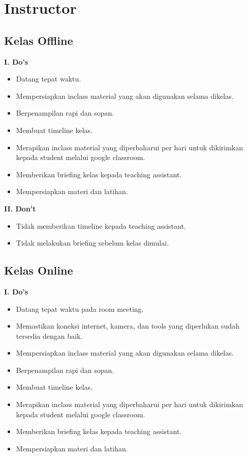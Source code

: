 \documentclass[
]{book}
\providecommand{\tightlist}{%
  \setlength{\itemsep}{0pt}\setlength{\parskip}{0pt}}
\begin{document}
\hypertarget{instructor}{%
\section{Instructor}\label{instructor}}

\hypertarget{kelas-offline-3}{%
\subsection{Kelas Offline}\label{kelas-offline-3}}

\textbf{I. Do's}

\begin{itemize}
\tightlist
\item
  Datang tepat waktu.
\item
  Mempersiapkan inclass material yang akan digunakan selama dikelas.
\item
  Berpenampilan rapi dan sopan.
\item
  Membuat timeline kelas.
\item
  Merapikan inclass material yang diperbaharui per hari untuk dikirimkan kepada student melalui google classroom.
\item
  Memberikan briefing kelas kepada teaching assistant.
\item
  Mempersiapkan materi dan latihan.
\end{itemize}

\textbf{II. Don't}

\begin{itemize}
\tightlist
\item
  Tidak memberikan timeline kepada teaching assistant.
\item
  Tidak melakukan briefing sebelum kelas dimulai.
\end{itemize}

\hypertarget{kelas-online-3}{%
\subsection{Kelas Online}\label{kelas-online-3}}

\textbf{I. Do's}

\begin{itemize}
\tightlist
\item
  Datang tepat waktu pada room meeting.
\item
  Memastikan koneksi internet, kamera, dan tools yang diperlukan sudah tersedia dengan baik.
\item
  Mempersiapkan inclass material yang akan digunakan selama dikelas.
\item
  Berpenampilan rapi dan sopan.
\item
  Membuat timeline kelas.
\item
  Merapikan inclass material yang diperbaharui per hari untuk dikirimkan kepada student melalui google classroom.
\item
  Memberikan briefing kelas kepada teaching assistant.
\item
  Mempersiapkan materi dan latihan.
\end{itemize}
\end{document}

